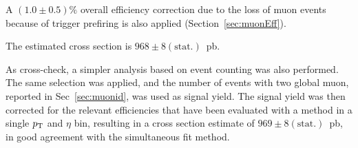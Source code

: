 A $(1.0\pm 0.5)\%$ overall efficiency correction due to the loss of muon events because of trigger
prefiring is also applied (Section~\ref{sec:muonEff}).

The estimated cross section is $968\pm 8 \mathrm{(stat.)}$~pb.

As cross-check, a simpler analysis based on event counting was also performed.
The same selection was applied, and the number of events with two global muon, reported
in Sec~\ref{sec:muonid}, was used as signal yield. 
The signal yield was then corrected for the relevant efficiencies that have 
been evaluated with a \TNP method in a single $p_{\mathrm{T}}$ and $\eta$ bin, resulting in a
cross section estimate of $969\pm 8 \mathrm{(stat.)}$~pb, in good agreement
with the simultaneous fit method.

